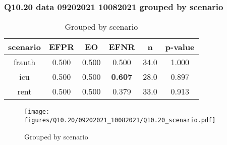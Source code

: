 \subsubsection{Q10.20 data 09202021 10082021 grouped by scenario}

\begin{comment}
           EFPR   EO      EFNR     n    pvalue
(frauth,)   0.5  0.5  0.500000  34.0  1.000000
(icu,)      0.5  0.5  0.607143  28.0  0.896890
(rent,)     0.5  0.5  0.378788  33.0  0.912596
\end{comment}

\begin{table}[h]
    \centering
    \begin{tabular}{|c|c|c|c|c|c|}
        \hline
        scenario & EFPR & EO & EFNR & n & p-value\\
        \hline
        frauth & 0.500 & 0.500 & 0.500 & 34.0 & 1.000\\
		icu & 0.500 & 0.500 & \textbf{0.607} & 28.0 & 0.897\\
		rent & 0.500 & 0.500 & 0.379 & 33.0 & 0.913\\
		
        \hline
    \end{tabular}
    \caption{Grouped by scenario}
    \label{tab:my_label}
\end{table}
\begin{figure}[h]
    \centering
    \texttt{[image: figures/Q10.20/09202021\_10082021/Q10.20\_scenario.pdf]}
    \caption{Grouped by scenario}
    \label{fig:my_label}
\end{figure}
